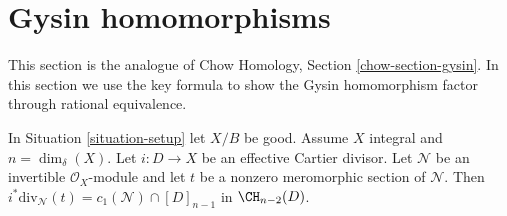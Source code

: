 \section{Gysin homomorphisms}
\label{section-gysin}

\noindent
This section is the analogue of
Chow Homology, Section \ref{chow-section-gysin}.
In this section we use the key formula to show the Gysin homomorphism
factor through rational equivalence.

\begin{lemma}
\label{lemma-gysin-factors-general}
In Situation \ref{situation-setup} let $X/B$ be good.
Assume $X$ integral and $n = \dim_\delta(X)$.
Let $i : D \to X$ be an effective Cartier divisor.
Let $\mathcal{N}$ be an invertible $\mathcal{O}_X$-module
and let $t$ be a nonzero meromorphic section of $\mathcal{N}$.
Then $i^*\text{div}_\mathcal{N}(t) = c_1(\mathcal{N}) \cap [D]_{n - 1}$
in $\CH_{n - 2}(D)$.
\end{lemma}

